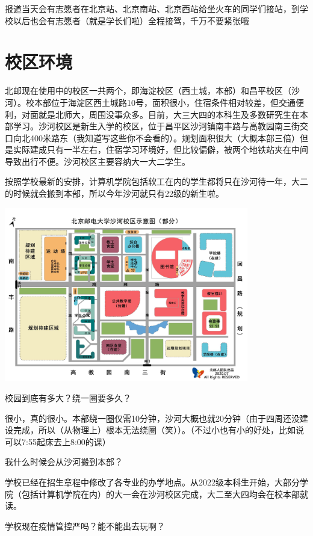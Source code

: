 \documentclass[UTF8]{ctexart}
\newcommand{\faq}[1]{{\heiti #1}}
\begin{document}
报道当天会有志愿者在北京站、北京南站、北京西站给坐火车的同学们接站，到学校以后也会有志愿者（就是学长们啦）全程接驾，千万不要紧张哦~

\section{校区环境}

北邮现在使用中的校区一共两个，即海淀校区（西土城，本部）和昌平校区（沙河）。校本部位于海淀区西土城路10号，面积很小，住宿条件相对较差，但交通便利，对面就是北师大，周围没事众多。目前，大三大四的本科生及多数研究生在本部学习。沙河校区是新生入学的校区，位于昌平区沙河镇南丰路{\small{}与高教园南三街交口向北400米路东（我知道写这些你不会看的）}。规划面积很大（大概本部三倍）但是实际建成只有一半左右，住宿学习环境好，但比较偏僻，被两个地铁站夹在中间导致出行不便。沙河校区主要容纳大一大二学生。

按照学校最新的安排，计算机学院包括软工在内的学生都将只在沙河待一年，大二的时候就会搬到本部，所以今年沙河就只有22级的新生啦。

\begin{center}
\includegraphics[width=0.80\textwidth]{images/shahe-map.png}
\end{center}

\faq{校园到底有多大？绕一圈要多久？}

很小，真的很小。本部绕一圈仅需10分钟，沙河大概也就20分钟（由于四周还没建设完成，所以（从物理上）根本无法绕圈（笑））。{\small （不过小也有小的好处，比如说可以7:55起床去上8:00的课）}

\faq{我什么时候会从沙河搬到本部？}

学校已经在招生章程中修改了各专业的办学地点。从2022级本科生开始，大部分学院（包括计算机学院在内）的大一会在沙河校区完成，大二至大四均会在校本部就读。

\faq{学校现在疫情管控严吗？能不能出去玩啊？}
\end{document}
